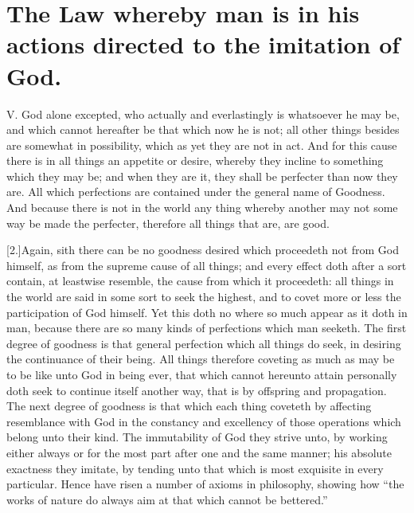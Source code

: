 \section*{The Law whereby man is in his actions directed to the imitation of God.}

V. God alone excepted, who actually and everlastingly is whatsoever he may be, and which cannot hereafter be that which now he is not; all other things besides are somewhat in possibility, which as yet they are not in act. And for this cause there is in all things an appetite or desire, whereby they incline to something which they may be; and when they are it, they shall be perfecter than now they are. All which perfections are contained under the general name of Goodness. And because there is not in the world any thing whereby another may not some way be made the perfecter, therefore all things that are, are good.

[2.]Again, sith there can be no goodness desired which proceedeth not from God himself, as from the supreme cause of all things; and every effect doth after a sort contain, at leastwise resemble, the cause from which it proceedeth: all things in the world are said in some sort to seek the highest, and to covet more or less the participation of God himself. Yet this doth no where so much appear as it doth in man, because there are so many kinds of perfections which man seeketh. The first degree of goodness is that general perfection which all things do seek, in desiring the continuance of their being. All things therefore coveting as much as may be to be like unto God in being ever, that which cannot hereunto  attain personally doth seek to continue itself another way, that is by offspring and propagation. The next degree of goodness is that which each thing coveteth by affecting resemblance with God in the constancy and excellency of those operations which belong unto their kind. The immutability of God they strive unto, by working either always or for the most part after one and the same manner; his absolute exactness they imitate, by tending unto that which is most exquisite in every particular. Hence have risen a number of axioms in philosophy, showing how “the works of nature do always aim at that which cannot be bettered.”

